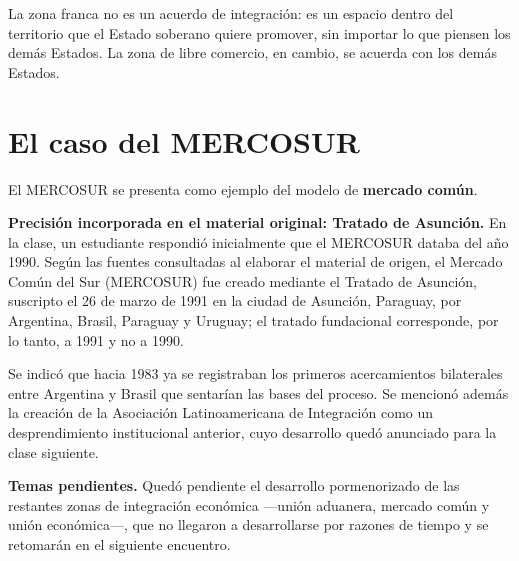 \documentclass[12pt,oneside]{book}
\begin{document}
\begin{important}
La zona franca no es un acuerdo de integración: es un espacio dentro del territorio que el Estado soberano quiere promover, sin importar lo que piensen los demás Estados. La zona de libre comercio, en cambio, se acuerda con los demás Estados.
\end{important}

\section{El caso del MERCOSUR}

El MERCOSUR se presenta como ejemplo del modelo de \textbf{mercado común}.

\begin{note}
\textbf{Precisión incorporada en el material original: Tratado de Asunción.} En la clase, un estudiante respondió inicialmente que el MERCOSUR databa del año 1990. Según las fuentes consultadas al elaborar el material de origen, el Mercado Común del Sur (MERCOSUR) fue creado mediante el Tratado de Asunción, suscripto el 26 de marzo de 1991 en la ciudad de Asunción, Paraguay, por Argentina, Brasil, Paraguay y Uruguay; el tratado fundacional corresponde, por lo tanto, a 1991 y no a 1990.
\end{note}

Se indicó que hacia 1983 ya se registraban los primeros acercamientos bilaterales entre Argentina y Brasil que sentarían las bases del proceso. Se mencionó además la creación de la Asociación Latinoamericana de Integración como un desprendimiento institucional anterior, cuyo desarrollo quedó anunciado para la clase siguiente.

\begin{note}
\textbf{Temas pendientes.} Quedó pendiente el desarrollo pormenorizado de las restantes zonas de integración económica —unión aduanera, mercado común y unión económica—, que no llegaron a desarrollarse por razones de tiempo y se retomarán en el siguiente encuentro.
\end{note}
\end{document}
